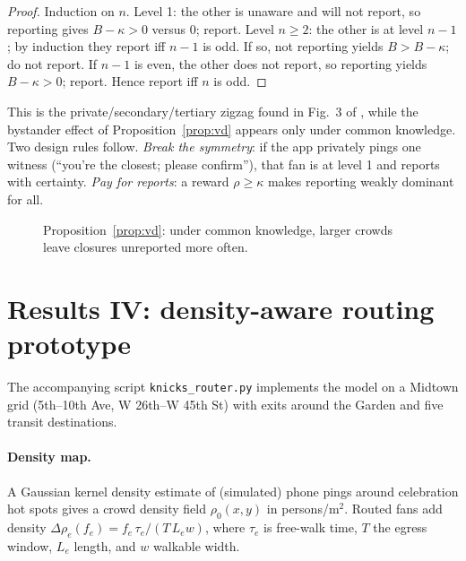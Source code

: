 \documentclass[11pt]{article}
\theoremstyle{definition}
\theoremstyle{remark}
\renewcommand{\Pr}{\mathbb{P}}
\newcommand{\1}{\mathbf{1}}
\begin{document}
\begin{proof}
Induction on $n$. Level 1: the other is unaware and will not report, so
reporting gives $B-\kappa>0$ versus $0$; report. Level $n\ge2$: the other
is at level $n-1$; by induction they report iff $n-1$ is odd. If so, not
reporting yields $B>B-\kappa$; do not report. If $n-1$ is even, the other
does not report, so reporting yields $B-\kappa>0$; report. Hence report iff
$n$ is odd.
\end{proof}

This is the private/secondary/tertiary zigzag found in Fig.~3 of
\cite{dfp}, while the bystander effect of Proposition~\ref{prop:vd}
appears only under common knowledge. Two design rules follow.
\emph{Break the symmetry}: if the app privately pings one witness
(``you're the closest; please confirm''), that fan is at level 1 and
reports with certainty. \emph{Pay for reports}: a reward $\rho\ge\kappa$
makes reporting weakly dominant for all.

\begin{figure}[!htbp]
\centering
{}
\caption{Proposition~\ref{prop:vd}: under common knowledge, larger crowds
leave closures unreported more often.}
\end{figure}

\section{Results IV: density-aware routing prototype}\label{sec:sim}

The accompanying script \texttt{knicks\_router.py} implements the model on
a Midtown grid (5th--10th Ave, W 26th--W 45th St) with exits around the
Garden and five transit destinations.

\paragraph{Density map.} A Gaussian kernel density estimate of (simulated)
phone pings around celebration hot spots gives a crowd density field
$\rho_0(x,y)$ in persons/m$^2$. Routed fans add density
$\Delta\rho_e(f_e)=f_e\,\tau_e/(T\,L_e w)$, where $\tau_e$ is free-walk
time, $T$ the egress window, $L_e$ length, and $w$ walkable width.
\end{document}
